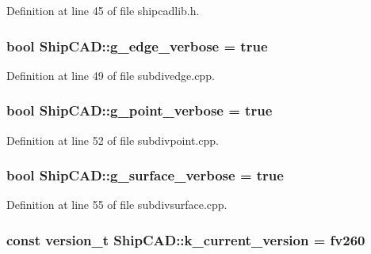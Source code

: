 Definition at line 45 of file shipcadlib.\-h.

\hypertarget{namespaceShipCAD_ad5a157bd082e37a863f05b7c54a1d7cc}{
\subsubsection[{g\-\_\-edge\-\_\-verbose}]{\setlength{\rightskip}{0pt plus 5cm}bool Ship\-C\-A\-D\-::g\-\_\-edge\-\_\-verbose = true}}\label{namespaceShipCAD_ad5a157bd082e37a863f05b7c54a1d7cc}


Definition at line 49 of file subdivedge.\-cpp.

\hypertarget{namespaceShipCAD_ae059a88fbc18c56ceee2fd1cd7f2aad0}{
\subsubsection[{g\-\_\-point\-\_\-verbose}]{\setlength{\rightskip}{0pt plus 5cm}bool Ship\-C\-A\-D\-::g\-\_\-point\-\_\-verbose = true}}\label{namespaceShipCAD_ae059a88fbc18c56ceee2fd1cd7f2aad0}


Definition at line 52 of file subdivpoint.\-cpp.

\hypertarget{namespaceShipCAD_a45538d3cd2c9293bf0bd4b09a23670ac}{
\subsubsection[{g\-\_\-surface\-\_\-verbose}]{\setlength{\rightskip}{0pt plus 5cm}bool Ship\-C\-A\-D\-::g\-\_\-surface\-\_\-verbose = true}}\label{namespaceShipCAD_a45538d3cd2c9293bf0bd4b09a23670ac}


Definition at line 55 of file subdivsurface.\-cpp.

\hypertarget{namespaceShipCAD_aa3415e1acf9bdb19e24f31f5138d6a60}{
\subsubsection[{k\-\_\-current\-\_\-version}]{\setlength{\rightskip}{0pt plus 5cm}const {\bf version\-\_\-t} Ship\-C\-A\-D\-::k\-\_\-current\-\_\-version = {\bf fv260}}}\label{namespaceShipCAD_aa3415e1acf9bdb19e24f31f5138d6a60}


